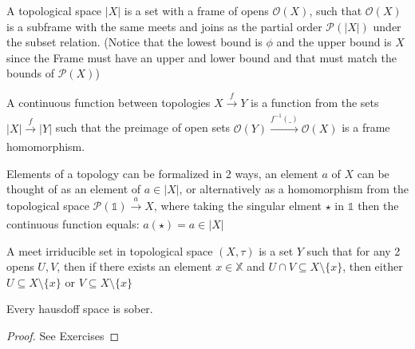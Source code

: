 \begin{definition}
    A topological space $|X|$ is a set with a frame of opens $\mathcal{O}(X)$, such that $\mathcal{O}(X)$ is a subframe with the same meets and joins as the partial order $\mathcal{P}(|X|)$ under the subset relation. (Notice that the lowest bound is $\phi$ and the upper bound is $X$ since the Frame must have an upper and lower bound and that must match the bounds of $\mathcal{P}(X)$)
\end{definition}
\begin{definition}
    A continuous function between topologies $X \xrightarrow[]{f} Y$ is a function from the sets $|X| \xrightarrow[]{f} |Y|$ such that the preimage of open sets $\mathcal{O}(Y) \xrightarrow[]{f^{-1}(\_)} \mathcal{O}(X)$ is a frame homomorphism.
\end{definition}
\begin{definition}
    Elements of a topology can be formalized in 2 ways, an element $a$ of $X$ can be thought of as an element of $a \in |X|$, or alternatively
    as a homomorphism from the topological space $\mathcal{P}(\mathbb{1}) \xrightarrow[]{a} X$, where taking the singular elment $\star$ in $\mathbb{1}$ then the continuous function equals: $a(\star) =a \in |X|$
\end{definition}
\begin{definition}
    A meet irriducible set in topological space $(X, \tau)$ is a set $Y$ such that for any 2 opens $U,V$, then if there exists an element $x \in \mathbb{X}$ and  $U \cap V \subseteq X \setminus \{x\}$, then either $U \subseteq X \setminus \{x\}$ or $V \subseteq X \setminus \{x\}$ 
\end{definition}
\begin{theorem}
    Every hausdoff space is sober.
\end{theorem}
\begin{proof}
    See Exercises
\end{proof}

